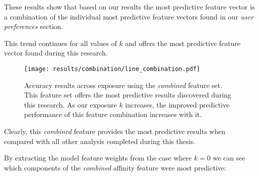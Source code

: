 These results show that based on our results the most predictive feature vector is a combination of the individual most predictive 
feature vectors found in our \emph{user preferences} section.

This trend continues for all values of $k$ and offers the most predictive feature vector found during this research.

\clearpage

\begin{figure}[h]
	\begin{center}
		\texttt{[image: results/combination/line\_combination.pdf]}
		\caption{Accuracy results across exposure using the \emph{combined} feature set. This feature set offers the most predictive 
				 results discovered during this research. As our exposure $k$ increases, the improved predictive performance of this 
				 feature combination increases with it.}
	\end{center}
\end{figure}

Clearly, this \emph{combined} feature provides the most predictive results when compared with all other analysis completed 
during this thesis.

\clearpage

By extracting the model feature weights from the case where $k=0$ we can see which components of the \emph{combined} affinity feature 
were most predictive:

